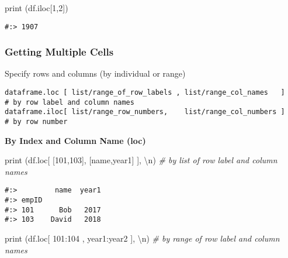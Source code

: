 \documentclass[
]{book}
\newenvironment{Shaded}{\begin{snugshade}}{\end{snugshade}}
\newcommand{\BuiltInTok}[1]{#1}
\newcommand{\CharTok}[1]{\textcolor[rgb]{0.5,0.5,0.5}{#1}}
\newcommand{\CommentTok}[1]{\textcolor[rgb]{0.37,0.37,0.37}{\textit{#1}}}
\newcommand{\DecValTok}[1]{\textcolor[rgb]{0.06,0.06,0.06}{#1}}
\newcommand{\NormalTok}[1]{#1}
\newcommand{\StringTok}[1]{\textcolor[rgb]{0.5,0.5,0.5}{#1}}
\begin{document}
\begin{Shaded}
\begin{Highlighting}[]
\BuiltInTok{print}\NormalTok{ (df.iloc[}\DecValTok{1}\NormalTok{,}\DecValTok{2}\NormalTok{])}
\end{Highlighting}
\end{Shaded}

\begin{verbatim}
#:> 1907
\end{verbatim}

\hypertarget{getting-multiple-cells}{%
\subsubsection{Getting Multiple Cells}\label{getting-multiple-cells}}

Specify rows and columns (by individual or range)

\begin{verbatim}
dataframe.loc [ list/range_of_row_labels , list/range_col_names   ]    # by row label and column names
dataframe.iloc[ list/range_row_numbers,    list/range_col_numbers ]    # by row number
\end{verbatim}

\textbf{By Index and Column Name (loc)}

\begin{Shaded}
\begin{Highlighting}[]
\BuiltInTok{print}\NormalTok{ (df.loc[ [}\DecValTok{101}\NormalTok{,}\DecValTok{103}\NormalTok{], [}\StringTok{\textquotesingle{}name\textquotesingle{}}\NormalTok{,}\StringTok{\textquotesingle{}year1\textquotesingle{}}\NormalTok{] ], }\StringTok{\textquotesingle{}}\CharTok{\textbackslash{}n}\StringTok{\textquotesingle{}}\NormalTok{)  }\CommentTok{\# by list of row label and column names}
\end{Highlighting}
\end{Shaded}

\begin{verbatim}
#:>         name  year1
#:> empID              
#:> 101      Bob   2017
#:> 103    David   2018
\end{verbatim}

\begin{Shaded}
\begin{Highlighting}[]
\BuiltInTok{print}\NormalTok{ (df.loc[  }\DecValTok{101}\NormalTok{:}\DecValTok{104}\NormalTok{ ,  }\StringTok{\textquotesingle{}year1\textquotesingle{}}\NormalTok{:}\StringTok{\textquotesingle{}year2\textquotesingle{}}\NormalTok{  ], }\StringTok{\textquotesingle{}}\CharTok{\textbackslash{}n}\StringTok{\textquotesingle{}}\NormalTok{)  }\CommentTok{\# by range of row label and column names}
\end{Highlighting}
\end{Shaded}
\end{document}
